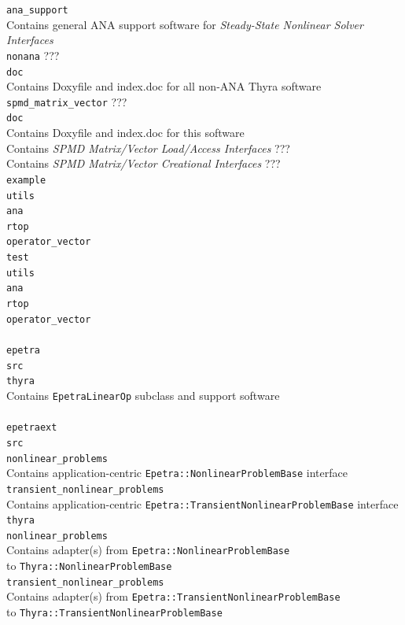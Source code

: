 \documentclass[pdf,ps2pdf,11pt]{SANDreport}
\begin{document}
\>\>\>\>\>\>\texttt{ana\_support} \\
\>\>\>\>\>\>\>Contains general ANA support software for {}\textit{Steady-State Nonlinear Solver Interfaces} \\
\>\>\>\texttt{nonana} ??? \\
\>\>\>\>\texttt{doc}\\
\>\>\>\>\>Contains Doxyfile and index.doc for all non-ANA Thyra software \\
\>\>\>\>\texttt{spmd\_matrix\_vector} ??? \\
\>\>\>\>\>\texttt{doc}\\
\>\>\>\>\>\>Contains Doxyfile and index.doc for this software \\
\>\>\>\>\>Contains {}\textit{SPMD Matrix/Vector Load/Access Interfaces} ??? \\
\>\>\>\>\>Contains {}\textit{SPMD Matrix/Vector Creational Interfaces} ??? \\
\>\>\texttt{example} \\
\>\>\>\texttt{utils}\\
\>\>\>\texttt{ana} \\
\>\>\>\>\texttt{rtop}\\
\>\>\>\>\texttt{operator\_vector} \\
\>\>\texttt{test} \\
\>\>\>\texttt{utils}\\
\>\>\>\texttt{ana} \\
\>\>\>\>\texttt{rtop}\\
\>\>\>\>\texttt{operator\_vector} \\
\\
\>\texttt{epetra} \\
\>\>\texttt{src} \\
\>\>\>\texttt{thyra} \\
\>\>\>\>Contains \texttt{EpetraLinearOp} subclass and support software \\
\\
\>\texttt{epetraext} \\
\>\>\texttt{src} \\
\>\>\>\texttt{nonlinear\_problems} \\
\>\>\>\>Contains application-centric \texttt{Epetra::NonlinearProblemBase} interface \\
\>\>\>\texttt{transient\_nonlinear\_problems} \\
\>\>\>\>Contains application-centric \texttt{Epetra::TransientNonlinearProblemBase} interface \\
\>\>\>\texttt{thyra} \\
\>\>\>\>\texttt{nonlinear\_problems} \\
\>\>\>\>\>Contains adapter(s) from \texttt{Epetra::NonlinearProblemBase} \\
\>\>\>\>\>to \texttt{Thyra::NonlinearProblemBase} \\
\>\>\>\>\texttt{transient\_nonlinear\_problems} \\
\>\>\>\>\>Contains adapter(s) from \texttt{Epetra::TransientNonlinearProblemBase}\\
\>\>\>\>\>to \texttt{Thyra::TransientNonlinearProblemBase} \\
\eifthen
\end{document}
